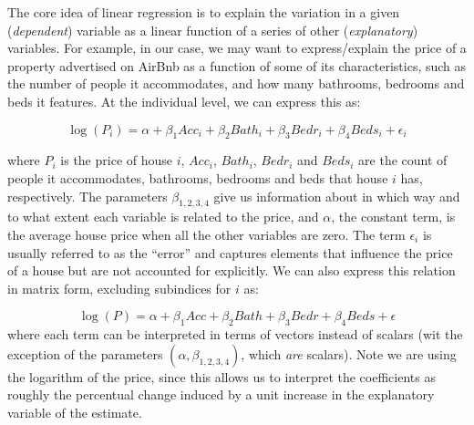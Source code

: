 \documentclass[
]{book}
\begin{document}
The core idea of linear regression is to explain the variation in a given (\emph{dependent}) variable as a linear function of a series of other (\emph{explanatory}) variables. For example, in our case, we may want to express/explain the price of a property advertised on AirBnb as a function of some of its characteristics, such as the number of people it accommodates, and how many bathrooms, bedrooms and beds it features. At the individual level, we can express this as:

\[
\log(P_i) = \alpha + \beta_1 Acc_i + \beta_2 Bath_i + \beta_3 Bedr_i + \beta_4 Beds_i + \epsilon_i
\]

where \(P_i\) is the price of house \(i\), \(Acc_i\), \(Bath_i\), \(Bedr_i\) and \(Beds_i\) are the count of people it accommodates, bathrooms, bedrooms and beds that house \(i\) has, respectively. The parameters \(\beta_{1,2, 3, 4}\) give us information about in which way and to what extent each variable is related to the price, and \(\alpha\), the constant term, is the average house price when all the other variables are zero. The term \(\epsilon_i\) is usually referred to as the ``error'' and captures elements that influence the price of a house but are not accounted for explicitly. We can also express this relation in matrix form, excluding subindices for \(i\) as:

\[
\log(P) = \alpha + \beta_1 Acc + \beta_2 Bath + \beta_3 Bedr + \beta_4 Beds + \epsilon
\]
where each term can be interpreted in terms of vectors instead of scalars (wit the exception of the parameters \((\alpha, \beta_{1, 2, 3, 4})\), which \emph{are} scalars). Note we are using the logarithm of the price, since this allows us to interpret the coefficients as roughly the percentual change induced by a unit increase in the explanatory variable of the estimate.
\end{document}
